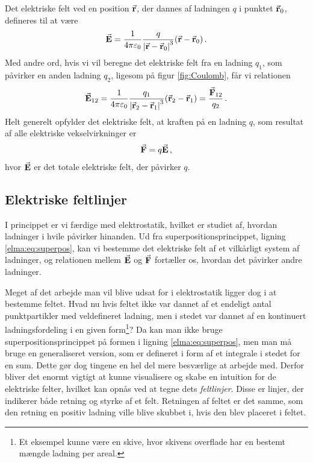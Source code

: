 Det elektriske felt ved en position $\va{r}$, der dannes af ladningen $q$ i punktet $\va r_0$, defineres til at være
\begin{equation} \label{eq:e-felt_punktpartikel}
    \va{E}=\frac{1}{4\pi\varepsilon_0}\frac{q}{\abs{\va r - \va r_0}^3}(\va r - \va r_0) \, .
\end{equation}
Med andre ord, hvis vi vil beregne det elektriske felt fra en ladning $q_1$, som påvirker en anden ladning $q_2$, ligesom på figur \ref{fig:Coulomb}, får vi relationen
\begin{equation} \label{eq:kraft_fra_e-felt}
    \va{E}_{12}=\frac{1}{4\pi\varepsilon_0}\frac{q_1}{\abs{\va r_2 - \va r_1}^3}(\va r_2 - \va r_1)=\frac{\va{F}_{12}}{q_2} \, .
\end{equation}
%
Helt generelt opfylder det elektriske felt, at kraften på en ladning $q$, som resultat af alle elektriske vekselvirkninger er
%
\begin{align} \label{eq:e-felt_def}
    \va F = q\va E \, ,
\end{align}
hvor $\va{E}$ er det totale elektriske felt, der påvirker $q$.

\subsection{Elektriske feltlinjer}

I princippet er vi færdige med elektrostatik, hvilket er studiet af, hvordan ladninger i hvile påvirker hinanden. Ud fra superpositionsprincippet, ligning \eqref{elma:eq:superpos}, kan vi bestemme det elektriske felt af et vilkårligt system af ladninger, og relationen mellem $\va{E}$ og $\va{F}$ fortæller os, hvordan det påvirker andre ladninger.

Meget af det arbejde man vil blive udsat for i elektrostatik ligger dog i at bestemme feltet. Hvad nu hvis feltet ikke var dannet af et endeligt antal punktpartikler med veldefineret ladning, men i stedet var dannet af en kontinuert ladningsfordeling i en given form\footnote{Et eksempel kunne være en skive, hvor skivens overflade har en bestemt mængde ladning per areal.}? Da kan man ikke bruge superpositionsprincippet på formen i ligning \eqref{elma:eq:superpos}, men man må bruge en generaliseret version, som er defineret i form af et integrale i stedet for en sum. Dette gør dog tingene en hel del mere besværlige at arbejde med. Derfor bliver det enormt vigtigt at kunne visualisere og skabe en intuition for de elektriske felter, hvilket kan opnås ved at tegne dets \emph{feltlinjer}. Disse er linjer, der indikerer både retning og styrke af et felt. Retningen af feltet er det samme, som den retning en positiv ladning ville blive skubbet i, hvis den blev placeret i feltet.

